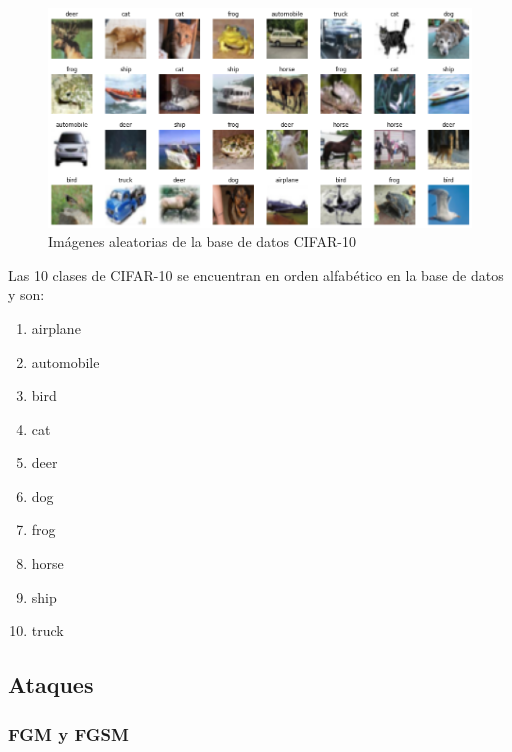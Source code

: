 \begin{figure}[h!]
    \centering
    \includegraphics[width=\textwidth]{images/cifar-10/cifar10.png}
    \caption{Imágenes aleatorias de la base de datos CIFAR-10}
    \label{cifar}
\end{figure}

Las 10 clases de CIFAR-10 se encuentran en orden alfabético en la base de datos y son:
\begin{enumerate}
    \item airplane
    \item automobile
    \item bird
    \item cat
    \item deer
    \item dog
    \item frog
    \item horse
    \item ship
    \item truck
\end{enumerate}

\pagebreak


\subsection{Ataques}

\subsubsection{FGM y FGSM}


